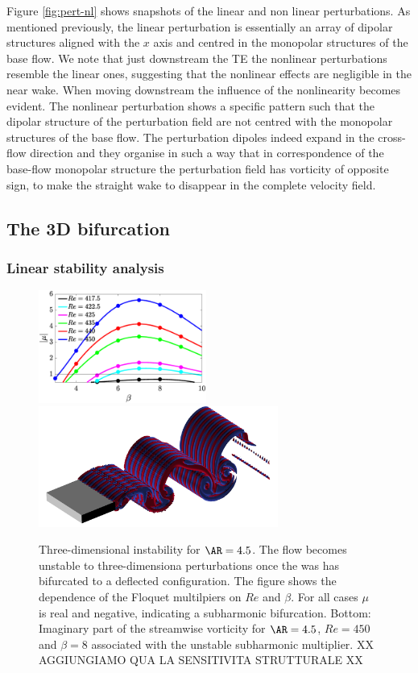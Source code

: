 Figure \ref{fig:pert-nl} shows snapshots of the linear and non linear perturbations. As mentioned previously, the linear perturbation is essentially an array of dipolar structures aligned with the $x$ axis and centred in the monopolar structures of the base flow. We note that just downstream the TE the nonlinear perturbations resemble the linear ones, suggesting that the nonlinear effects are negligible in the near wake. When moving downstream the influence of the nonlinearity becomes evident. The nonlinear perturbation shows a specific pattern such that the dipolar structure of the perturbation field are not centred with the monopolar structures of the base flow. The perturbation dipoles indeed expand in the cross-flow direction and they organise in such a way that in correspondence of the base-flow monopolar structure the perturbation field has vorticity of opposite sign, to make the straight wake to disappear in the complete velocity field.

\subsection{The 3D bifurcation}

\subsubsection{Linear stability analysis}

\begin{figure}
  \centering
  \includegraphics[width=0.49\textwidth]{./fig/AR4p5/multipliers_3D.eps}
  \includegraphics[trim={0 0 0 0},clip,width=0.7\textwidth]{./fig/AR4p5/Floqetmode_beta_8_Re450_AR4p5.png}  
  \caption{Three-dimensional instability for $\AR=4.5$. The flow becomes unstable to three-dimensiona perturbations once the was has bifurcated to a deflected configuration. The figure shows the dependence of the Floquet multilpiers on $Re$ and $\beta$. For all cases $\mu$ is real and negative, indicating a subharmonic bifurcation. Bottom: Imaginary part of the streamwise vorticity for $\AR=4.5$, $Re=450$ and $\beta=8$ associated with the unstable subharmonic multiplier. XX AGGIUNGIAMO QUA LA SENSITIVITA STRUTTURALE XX}
  \label{fig:mul-3d-ar4p5}
\end{figure}

